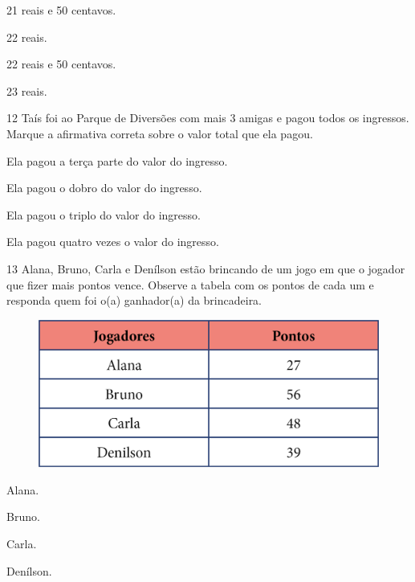 \begin{escolha}[itemsep=-5pt]
\item 21 reais e 50 centavos.

\item 22 reais.

\item 22 reais e 50 centavos.

\item 23 reais.
\end{escolha}

\num{12} Taís foi ao Parque de Diversões com mais 3 amigas e pagou todos os ingressos. Marque a afirmativa correta sobre o valor total que ela pagou.

\begin{escolha}[itemsep=-5pt]
\item Ela pagou a terça parte do valor do ingresso.

\item Ela pagou o dobro do valor do ingresso.

\item Ela pagou o triplo do valor do ingresso.

\item Ela pagou quatro vezes o valor do ingresso.
\end{escolha}

\num{13} Alana, Bruno, Carla e Denílson estão brincando de um jogo em que o
jogador que fizer mais pontos vence. Observe a tabela com os pontos de
cada um e responda quem foi o(a) ganhador(a) da brincadeira.

\begin{figure}[H]
\centering
\includegraphics[width=.7\textwidth]{./media/image121.png}
\end{figure}

\begin{escolha}[itemsep=-5pt]
\item Alana.

\item Bruno.

\item Carla.

\item Denílson.
\end{escolha}

